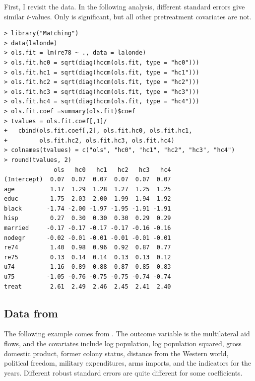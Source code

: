 First, I revisit the  data. In the following analysis,  different standard errors give similar $t$-values. Only  is significant, but all other pretreatment covariates are not. 



\begin{lstlisting}
> library("Matching")
> data(lalonde)
> ols.fit = lm(re78 ~ ., data = lalonde)
> ols.fit.hc0 = sqrt(diag(hccm(ols.fit, type = "hc0")))
> ols.fit.hc1 = sqrt(diag(hccm(ols.fit, type = "hc1")))
> ols.fit.hc2 = sqrt(diag(hccm(ols.fit, type = "hc2")))
> ols.fit.hc3 = sqrt(diag(hccm(ols.fit, type = "hc3")))
> ols.fit.hc4 = sqrt(diag(hccm(ols.fit, type = "hc4")))
> ols.fit.coef =summary(ols.fit)$coef
> tvalues = ols.fit.coef[,1]/
+   cbind(ols.fit.coef[,2], ols.fit.hc0, ols.fit.hc1, 
+         ols.fit.hc2, ols.fit.hc3, ols.fit.hc4)
> colnames(tvalues) = c("ols", "hc0", "hc1", "hc2", "hc3", "hc4")
> round(tvalues, 2)
              ols   hc0   hc1   hc2   hc3   hc4
(Intercept)  0.07  0.07  0.07  0.07  0.07  0.07
age          1.17  1.29  1.28  1.27  1.25  1.25
educ         1.75  2.03  2.00  1.99  1.94  1.92
black       -1.74 -2.00 -1.97 -1.95 -1.91 -1.91
hisp         0.27  0.30  0.30  0.30  0.29  0.29
married     -0.17 -0.17 -0.17 -0.17 -0.16 -0.16
nodegr      -0.02 -0.01 -0.01 -0.01 -0.01 -0.01
re74         1.40  0.98  0.96  0.92  0.87  0.77
re75         0.13  0.14  0.14  0.13  0.13  0.12
u74          1.16  0.89  0.88  0.87  0.85  0.83
u75         -1.05 -0.76 -0.75 -0.75 -0.74 -0.74
treat        2.61  2.49  2.46  2.45  2.41  2.40
\end{lstlisting}


\subsection{Data from  \citet{king2015robust}}
\label{sec::example-ehw-kingdata1}



The following example comes from \citet{king2015robust}. The outcome variable is the multilateral aid flows, and the covariates include log population, log population squared, gross domestic product, former colony status, distance from the Western world, political freedom, military expenditures, arms imports, and the indicators for the years. Different robust standard errors are quite different for some coefficients. 
 

